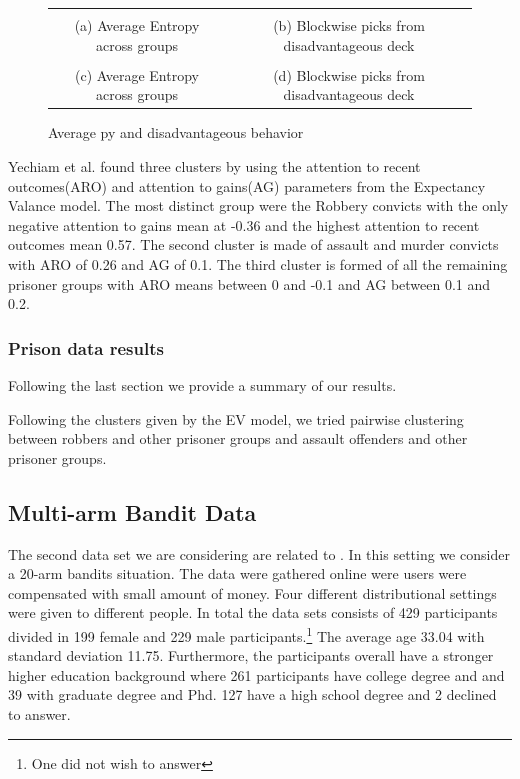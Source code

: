 \documentclass[12pt,a4paper,bibliography=totocnumbered,listof=totocnumbered]{scrartcl}
\begin{document}
\setlength{\tabcolsep}{-0.2cm}
\renewcommand{\arraystretch}{-0.6}
\begin{figure}[!htbp]
	\small
	\begin{tabular}{cc}
	 &  \\
	(a) Average Entropy across groups & (b) Blockwise picks from disadvantageous deck \\
	 &  \\
	(c) Average Entropy across groups & (d) Blockwise picks from disadvantageous deck 
	\end{tabular}
	\caption{Average py and disadvantageous behavior}
	\label{fig:ent}
\end{figure}

Yechiam et al. found three clusters by using the attention to recent outcomes(ARO) and attention to gains(AG) parameters from the Expectancy Valance model. The most distinct group were the Robbery convicts with the only negative attention to gains mean at -0.36 and the highest attention to recent outcomes mean 0.57. The second cluster is made of assault and murder convicts with ARO of 0.26 and AG of 0.1. The third cluster is formed of all the remaining prisoner groups with ARO means between 0 and -0.1 and AG between 0.1 and 0.2.

\subsubsection{Prison data results}

Following the last section we provide a summary of our results. 

Following the clusters given by the EV model, we tried pairwise clustering between robbers and other prisoner groups and assault offenders and other prisoner groups.

\subsection{Multi-arm Bandit Data}

The second data set we are considering are related to \cite{Stojic2015}. In this setting we consider a 20-arm bandits situation. The data were gathered online were users were compensated with small amount of money. Four different distributional settings were given to different people. In total the data sets consists of 429 participants divided in 199 female and 229 male participants.\footnote{One did not wish to answer} The average age 33.04 with standard deviation 11.75. Furthermore, the participants overall have a stronger higher education background where 261 participants have college degree and and 39 with graduate degree and Phd. 127 have a high school degree and 2 declined to answer.
\end{document}
